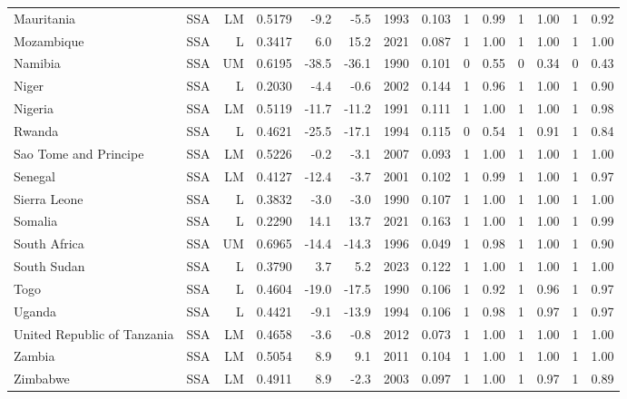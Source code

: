\begin{longtable}{llrrrrrrrrrrrr}
Mauritania & SSA & LM & 0.5179 &  -9.2 &  -5.5 & 1993 & 0.103 & 1 & 0.99 & 1 & 1.00 & 1 & 0.92 \\
Mozambique & SSA & L & 0.3417 &   6.0 &  15.2 & 2021 & 0.087 & 1 & 1.00 & 1 & 1.00 & 1 & 1.00 \\
Namibia & SSA & UM & 0.6195 & -38.5 & -36.1 & 1990 & 0.101 & 0 & 0.55 & 0 & 0.34 & 0 & 0.43 \\
Niger & SSA & L & 0.2030 &  -4.4 &  -0.6 & 2002 & 0.144 & 1 & 0.96 & 1 & 1.00 & 1 & 0.90 \\
Nigeria & SSA & LM & 0.5119 & -11.7 & -11.2 & 1991 & 0.111 & 1 & 1.00 & 1 & 1.00 & 1 & 0.98 \\
Rwanda & SSA & L & 0.4621 & -25.5 & -17.1 & 1994 & 0.115 & 0 & 0.54 & 1 & 0.91 & 1 & 0.84 \\
Sao Tome and Principe & SSA & LM & 0.5226 &  -0.2 &  -3.1 & 2007 & 0.093 & 1 & 1.00 & 1 & 1.00 & 1 & 1.00 \\
Senegal & SSA & LM & 0.4127 & -12.4 &  -3.7 & 2001 & 0.102 & 1 & 0.99 & 1 & 1.00 & 1 & 0.97 \\
Sierra Leone & SSA & L & 0.3832 &  -3.0 &  -3.0 & 1990 & 0.107 & 1 & 1.00 & 1 & 1.00 & 1 & 1.00 \\
Somalia & SSA & L & 0.2290 &  14.1 &  13.7 & 2021 & 0.163 & 1 & 1.00 & 1 & 1.00 & 1 & 0.99 \\
South Africa & SSA & UM & 0.6965 & -14.4 & -14.3 & 1996 & 0.049 & 1 & 0.98 & 1 & 1.00 & 1 & 0.90 \\
South Sudan & SSA & L & 0.3790 &   3.7 &   5.2 & 2023 & 0.122 & 1 & 1.00 & 1 & 1.00 & 1 & 1.00 \\
Togo & SSA & L & 0.4604 & -19.0 & -17.5 & 1990 & 0.106 & 1 & 0.92 & 1 & 0.96 & 1 & 0.97 \\
Uganda & SSA & L & 0.4421 &  -9.1 & -13.9 & 1994 & 0.106 & 1 & 0.98 & 1 & 0.97 & 1 & 0.97 \\
United Republic of Tanzania & SSA & LM & 0.4658 &  -3.6 &  -0.8 & 2012 & 0.073 & 1 & 1.00 & 1 & 1.00 & 1 & 1.00 \\
Zambia & SSA & LM & 0.5054 &   8.9 &   9.1 & 2011 & 0.104 & 1 & 1.00 & 1 & 1.00 & 1 & 1.00 \\
Zimbabwe & SSA & LM & 0.4911 &   8.9 &  -2.3 & 2003 & 0.097 & 1 & 1.00 & 1 & 0.97 & 1 & 0.89 \\
\end{longtable}
